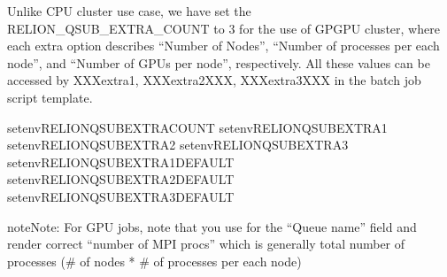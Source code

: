\documentclass[a4paper,11pt,english]{sphinxmanual}
\begin{document}
\sphinxAtStartPar
Unlike CPU cluster use case, we have set the RELION\_QSUB\_EXTRA\_COUNT to 3 for the use of GPGPU cluster,
where each extra option describes “Number of Nodes”, “Number of processes per each node”, and “Number of GPUs per node”, respectively. All these values can be accessed by XXXextra1, XXXextra2XXX, XXXextra3XXX
in the batch job script template.

\begin{sphinxVerbatim}[commandchars=\\\{\}]
setenvRELION\PYGZus{}QSUB\PYGZus{}EXTRA\PYGZus{}COUNT
setenvRELION\PYGZus{}QSUB\PYGZus{}EXTRA1
setenvRELION\PYGZus{}QSUB\PYGZus{}EXTRA2
setenvRELION\PYGZus{}QSUB\PYGZus{}EXTRA3
setenvRELION\PYGZus{}QSUB\PYGZus{}EXTRA1\PYGZus{}DEFAULT
setenvRELION\PYGZus{}QSUB\PYGZus{}EXTRA2\PYGZus{}DEFAULT
setenvRELION\PYGZus{}QSUB\PYGZus{}EXTRA3\PYGZus{}DEFAULT
\end{sphinxVerbatim}


\begin{sphinxadmonition}{note}{Note:}
\sphinxAtStartPar
For GPU jobs, note that you  use  for the “Queue name” field and render correct “number of MPI procs” which is generally total number of processes (\# of nodes * \# of processes per each node)
\end{sphinxadmonition}
\end{document}
